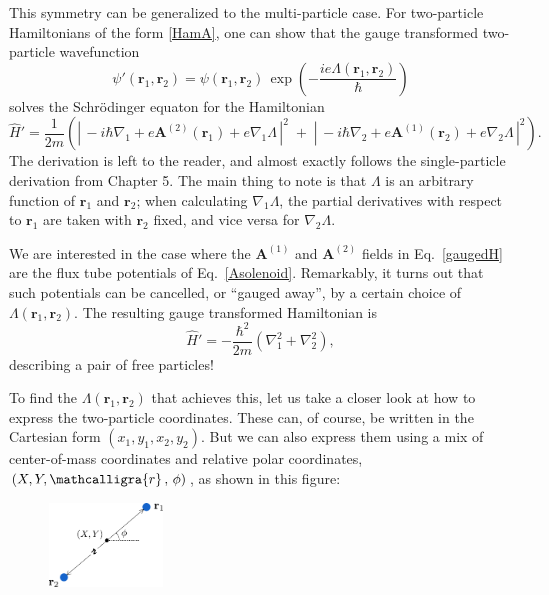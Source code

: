 \documentclass[pra,12pt]{revtex4}
\begin{document}
This symmetry can be generalized to the multi-particle case.  For
two-particle Hamiltonians of the form \eqref{HamA}, one can show that
the gauge transformed two-particle wavefunction
\begin{equation}
  \psi'(\mathbf{r}_1, \mathbf{r}_2) = \psi(\mathbf{r}_1, \mathbf{r}_2)
  \, \exp\!\left(-\frac{ie\Lambda(\mathbf{r}_1, \mathbf{r}_2)}{\hbar}\right)
\end{equation}
solves the Schr\"odinger equaton for the Hamiltonian
\begin{equation}
  \hat{H}' = \frac{1}{2m} \left( \left| \, -i\hbar \nabla_1
  + e\mathbf{A}^{(2)}(\mathbf{r}_1) + e \nabla_1 \Lambda\,\right|^2
  \;+\; \left| \, -i\hbar \nabla_2
  + e\mathbf{A}^{(1)}(\mathbf{r}_2) + e \nabla_2\Lambda\,\right|^2\right).
  \label{gaugedH}
\end{equation}
The derivation is left to the reader, and almost exactly follows the
single-particle derivation from Chapter 5.  The main thing to note is
that $\Lambda$ is an arbitrary function of $\mathbf{r}_1$ and
$\mathbf{r}_2$; when calculating $\nabla_1\Lambda$, the partial
derivatives with respect to $\mathbf{r}_1$ are taken with
$\mathbf{r}_2$ fixed, and vice versa for $\nabla_2\Lambda$.

We are interested in the case where the $\mathbf{A}^{(1)}$ and
$\mathbf{A}^{(2)}$ fields in Eq.~\eqref{gaugedH} are the flux tube
potentials of Eq.~\eqref{Asolenoid}.  Remarkably, it turns out that
such potentials can be cancelled, or ``gauged away'', by a certain
choice of $\Lambda(\mathbf{r}_1, \mathbf{r}_2)$.  The resulting gauge
transformed Hamiltonian is
\begin{equation}
  \hat{H}' = - \frac{\hbar^2}{2m} \left( \nabla_1^2 + \nabla_2^2\right),
  \label{gaugedH2}
\end{equation}
describing a pair of free particles!

\clearpage
To find the $\Lambda(\mathbf{r}_1,\mathbf{r}_2)$ that achieves this,
let us take a closer look at how to express the two-particle
coordinates.  These can, of course, be written in the Cartesian form
$(x_1, y_1, x_2, y_2)$.  But we can also express them using a mix of
center-of-mass coordinates and relative polar coordinates, $(X, Y,
\mathcalligra{r}\,,\, \phi)$, as shown in this figure:

\begin{figure}[h]
  \centering\includegraphics[width=0.27\textwidth]{anyon-coordinates}
\end{figure}
\end{document}
